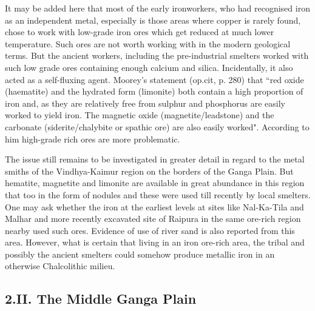 It may be added here that most of the early ironworkers, who had recognised iron as an independent metal, especially is those areas where copper is rarely found, chose to work with low-grade iron ores which get reduced at much lower temperature. Such ores are not worth working with in the modern geological terms. But the ancient workers, including the pre-industrial smelters worked with such low grade ores containing enough calcium and silica. Incidentally, it also acted as a self-fluxing agent. Moorey's statement (op.cit, p. 280) that ``red oxide (haematite) and the hydrated form (limonite) both contain a high proportion of iron and, as they are relatively free from sulphur and phosphorus are easily worked to yield iron. The magnetic oxide (magnetite/leadstone) and the carbonate (siderite/chalybite or spathic ore) are also easily worked". According to him high-grade rich ores are more problematic.

The issue still remains to be investigated in greater detail in regard to the metal smiths of the Vindhya-Kaimur region on the borders of the Ganga Plain. But hematite, magnetite and limonite are available in great abundance in this region that too in the form of nodules and these were used till recently by local smelters. One may ask whether the iron at the earliest levels at sites like Nal-Ka-Tila and Malhar and more recently excavated site of Raipura in the same ore-rich region nearby used such ores. Evidence of use of river sand is also reported from this area. However, what is certain that living in an iron ore-rich area, the tribal and possibly the ancient smelters could somehow produce metallic iron in an otherwise Chalcolithic milieu.

\subsection*{2.II. The Middle Ganga Plain}\label{subsection-5}

\vspace{-.2cm}

